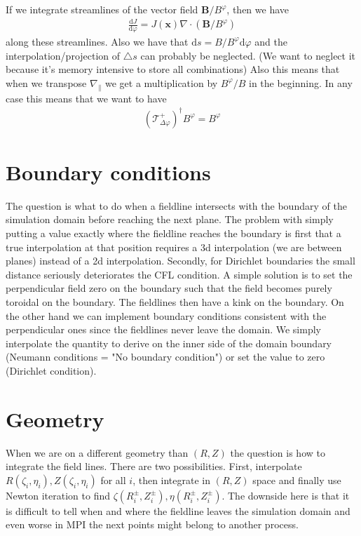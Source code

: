 \documentclass{hitec} %
\renewcommand{\d}{\mathrm{d}}
\renewcommand{\vec}[1]{{\mathbf{#1}}}
\newcommand{\Tp}{\mathcal T^+_{\Delta\varphi}}
\begin{document}
If we integrate streamlines of the vector field $\vec B/B^\varphi$, then we have
\begin{align}
    \frac{\d J}{\d \varphi} = J(\vec x ) \nabla\cdot\left( \vec B/B^\varphi\right)
    \label{}
\end{align}
along these streamlines.
Also we have that $\d s = B/B^\varphi \d \varphi $ and the interpolation/projection of $\triangle s$ can probably be neglected. (We want to neglect it because it's memory intensive to store all combinations)
Also this means that when we transpose $\nabla_\parallel$ we get a 
multiplication by $B^\varphi/B$ in the beginning.
In any case this means that we want to have 
\begin{align}
\left(\Tp\right)^\dagger B^\varphi  =  B^\varphi
\end{align}
\section{Boundary conditions}
The question is what to do when a fieldline intersects with the boundary
of the simulation domain before reaching the next plane.
The problem with simply putting a value exactly where the fieldline 
reaches the boundary is first that a true interpolation at that 
position requires a 3d interpolation (we 
are between planes) instead of a 2d interpolation.
Secondly, for Dirichlet boundaries the small 
distance seriously deteriorates the CFL condition.
A simple solution is to set the perpendicular field zero on the 
boundary such that the field becomes purely 
toroidal on the boundary. The fieldlines then have a kink on the 
boundary. On the other hand we can implement boundary conditions consistent with 
the perpendicular ones since the fieldlines never leave the domain. 
We simply interpolate the quantity to derive on the inner side of the
domain boundary (Neumann conditions = "No boundary condition") or 
set the value to zero (Dirichlet condition).


\section{Geometry}
When we are on a different geometry than $(R,Z)$ the question is how to integrate the field lines. There are two possibilities. 
First, interpolate $R(\zeta_i, \eta_i), Z(\zeta_i, \eta_i)$ for 
all $i$, then integrate in $(R,Z)$ space and finally use
Newton iteration to find $\zeta(R^\pm_i, Z^\pm_i), \eta(R^\pm_i, Z^\pm_i)$. 
The downside here is that it is difficult to tell when and where the fieldline leaves the simulation domain and even worse in MPI the next points might belong to another process. 
\end{document}
